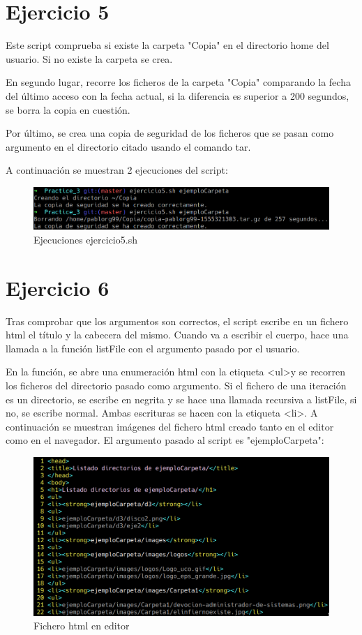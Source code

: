 \documentclass{article}
\begin{document}
\section{Ejercicio 5}
Este script comprueba si existe la carpeta "Copia" en el directorio home del usuario. Si no existe la carpeta se crea.\par
En segundo lugar, recorre los ficheros de la carpeta "Copia" comparando la fecha del último acceso con la fecha actual, si la diferencia es superior a 200 segundos, se borra la copia en cuestión. \par
Por último, se crea una copia de seguridad de los ficheros que se pasan como argumento en el directorio citado usando el comando tar. \par
A continuación se muestran 2 ejecuciones del script: 

\begin{figure}[ht]
    \centering
    \includegraphics[width=1\textwidth]{ejercicio5.png}
    \caption{Ejecuciones ejercicio5.sh}
\end{figure}

\section{Ejercicio 6}
Tras comprobar que los argumentos son correctos, el script escribe en un fichero html el título y la cabecera del mismo. Cuando va a escribir el cuerpo, hace una llamada a la función listFile con el argumento pasado por el usuario. \par
En la función, se abre una enumeración html con la etiqueta \textless ul\textgreater \space y se recorren los ficheros del directorio pasado como argumento. Si el fichero de una iteración es un directorio, se escribe en negrita y se hace una llamada recursiva a listFile, si no, se escribe normal. Ambas escrituras se hacen con la etiqueta  \textless li\textgreater .
A continuación se muestran imágenes del fichero html creado tanto en el editor como en el navegador. El argumento pasado al script es "ejemploCarpeta":

\begin{figure}[ht]
	\centering
	\includegraphics[width=1\textwidth]{ejercicio6-1.png}
	\caption{Fichero html en editor}
\end{figure}
\end{document}
